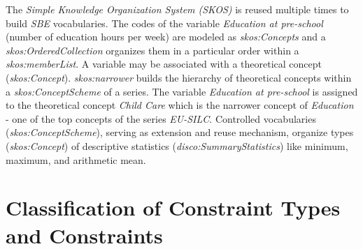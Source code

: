 \documentclass{llncs}
\begin{document}
The \emph{Simple Knowledge Organization System (SKOS)} is reused multiple times to build \emph{SBE} vocabularies.
The codes of the variable \emph{Education at pre-school} (number of education hours per week) are modeled as \emph{skos:Concepts} and 
a \emph{skos:OrderedCollection} organizes them in a particular order within a \emph{skos:memberList}.
A variable may be associated with a theoretical concept (\emph{skos:Concept}). 
\emph{skos:narrower} builds the hierarchy of theoretical concepts within a \emph{skos:ConceptScheme} of a series.
The variable \emph{Education at pre-school} is assigned to the theoretical concept \emph{Child Care} which is the narrower concept of \emph{Education} - one of the top concepts of the series \emph{EU-SILC}.
Controlled vocabularies (\emph{skos:ConceptScheme}), serving as extension and reuse mechanism,
organize types (\emph{skos:Concept}) of descriptive statistics (\emph{disco:SummaryStatistics}) like minimum, maximum, and arithmetic mean.


\section{Classification of Constraint Types and Constraints}
\label{classification}
\end{document}
